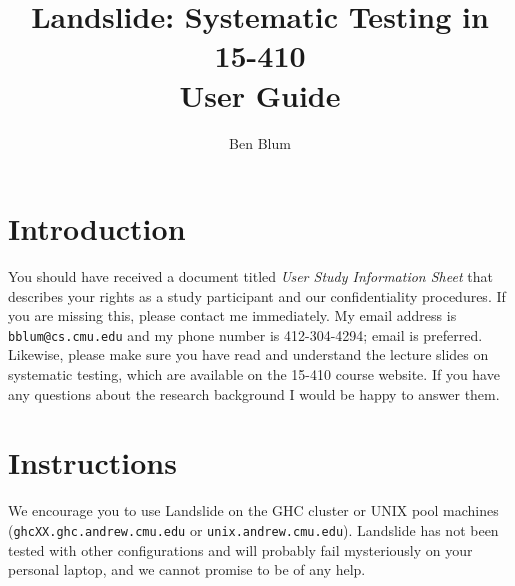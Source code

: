 \documentclass{article}
\begin{document}

\title{\bf Landslide: Systematic Testing in 15-410 \\ User Guide}
\author{Ben Blum}
\date{}
\maketitle

\section{Introduction}

You should have received a document titled {\em User Study Information Sheet} that describes your rights as a study
participant and our confidentiality procedures. If you are missing this, please contact me immediately. My email
address is {\tt bblum@cs.cmu.edu} and my phone number is 412-304-4294; email is preferred.
\\

\noindent Likewise, please make sure you have read and understand the lecture slides on systematic testing, which are
available on the 15-410 course website. If you have any questions about the research background I would be
happy to answer them.

\section{Instructions}

We encourage you to use Landslide on the GHC cluster or UNIX pool machines ({\tt ghcXX.ghc.andrew.cmu.edu}
or {\tt unix.andrew.cmu.edu}). Landslide has not been tested with other configurations and will probably fail
mysteriously on your personal laptop, and we cannot promise to be of any help.
\end{document}
